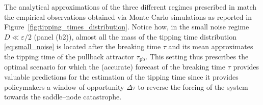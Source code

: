 \documentclass[openacc]{rsproca_new}
\begin{document}
The analytical approximations of the three different regimes prescribed in \cite{Berglund2013, Miller2012, Herbert2017} match the empirical observations obtained via Monte Carlo simulations as reported in Figure~\ref{fig:tipping_times_distribution}.
Notice how, in the small noise regime $D\ll \varepsilon/2$ (panel (b2)), almost all the mass of the tipping time distribution \eqref{eq:small_noise} is located after the breaking time $\tau$ and its mean approximates the tipping time of the pullback attractor $\tau_{\mathrm{pb}}$.
This setting thus prescribes the optimal scenario for which the (accurate) forecast of the breaking time $\tau$ provides valuable predictions for the estimation of the tipping time since it provides policymakers a window of opportunity $\Delta\tau$ to reverse the forcing of the system towards the saddle--node catastrophe.
\end{document}
